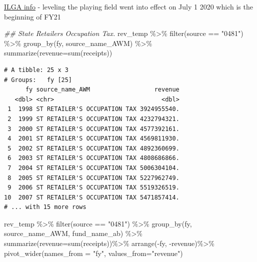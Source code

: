 \documentclass[
  letterpaper,
  DIV=11,
  numbers=noendperiod]{scrreport}
\newenvironment{Shaded}{\begin{snugshade}}{\end{snugshade}}
\newcommand{\AttributeTok}[1]{\textcolor[rgb]{0.40,0.45,0.13}{#1}}
\newcommand{\DocumentationTok}[1]{\textcolor[rgb]{0.37,0.37,0.37}{\textit{#1}}}
\newcommand{\FunctionTok}[1]{\textcolor[rgb]{0.28,0.35,0.67}{#1}}
\newcommand{\NormalTok}[1]{\textcolor[rgb]{0.00,0.23,0.31}{#1}}
\newcommand{\SpecialCharTok}[1]{\textcolor[rgb]{0.37,0.37,0.37}{#1}}
\newcommand{\StringTok}[1]{\textcolor[rgb]{0.13,0.47,0.30}{#1}}
\begin{document}
\href{https://www.ilga.gov/legislation/ilcs/ilcs5.asp?ActID=3993\&ChapterID=8}{ILGA
info} - leveling the playing field went into effect on July 1 2020 which
is the beginning of FY21

\begin{Shaded}
\begin{Highlighting}[]
\DocumentationTok{\#\# State Retailers Occupation Tax. }
\NormalTok{rev\_temp }\SpecialCharTok{\%\textgreater{}\%} \FunctionTok{filter}\NormalTok{(source }\SpecialCharTok{==} \StringTok{"0481"}\NormalTok{) }\SpecialCharTok{\%\textgreater{}\%}
  \FunctionTok{group\_by}\NormalTok{(fy, source\_name\_AWM) }\SpecialCharTok{\%\textgreater{}\%} \FunctionTok{summarize}\NormalTok{(}\AttributeTok{revenue=}\FunctionTok{sum}\NormalTok{(receipts))}
\end{Highlighting}
\end{Shaded}

\begin{verbatim}
# A tibble: 25 x 3
# Groups:   fy [25]
      fy source_name_AWM                  revenue
   <dbl> <chr>                              <dbl>
 1  1998 ST RETAILER'S OCCUPATION TAX 3924955540.
 2  1999 ST RETAILER'S OCCUPATION TAX 4232794321.
 3  2000 ST RETAILER'S OCCUPATION TAX 4577392161.
 4  2001 ST RETAILER'S OCCUPATION TAX 4569811930.
 5  2002 ST RETAILER'S OCCUPATION TAX 4892360699.
 6  2003 ST RETAILER'S OCCUPATION TAX 4808686866.
 7  2004 ST RETAILER'S OCCUPATION TAX 5006304104.
 8  2005 ST RETAILER'S OCCUPATION TAX 5227962749.
 9  2006 ST RETAILER'S OCCUPATION TAX 5519326519.
10  2007 ST RETAILER'S OCCUPATION TAX 5471857414.
# ... with 15 more rows
\end{verbatim}

\begin{Shaded}
\begin{Highlighting}[]
\NormalTok{rev\_temp }\SpecialCharTok{\%\textgreater{}\%} 
  \FunctionTok{filter}\NormalTok{(source }\SpecialCharTok{==} \StringTok{"0481"}\NormalTok{) }\SpecialCharTok{\%\textgreater{}\%}
  \FunctionTok{group\_by}\NormalTok{(fy, source\_name\_AWM, fund\_name\_ab) }\SpecialCharTok{\%\textgreater{}\%} 
  \FunctionTok{summarize}\NormalTok{(}\AttributeTok{revenue=}\FunctionTok{sum}\NormalTok{(receipts))}\SpecialCharTok{\%\textgreater{}\%}
  \FunctionTok{arrange}\NormalTok{(}\SpecialCharTok{{-}}\NormalTok{fy, }\SpecialCharTok{{-}}\NormalTok{revenue)}\SpecialCharTok{\%\textgreater{}\%}
  \FunctionTok{pivot\_wider}\NormalTok{(}\AttributeTok{names\_from =} \StringTok{"fy"}\NormalTok{, }\AttributeTok{values\_from=}\StringTok{"revenue"}\NormalTok{)}
\end{Highlighting}
\end{Shaded}
\end{document}
